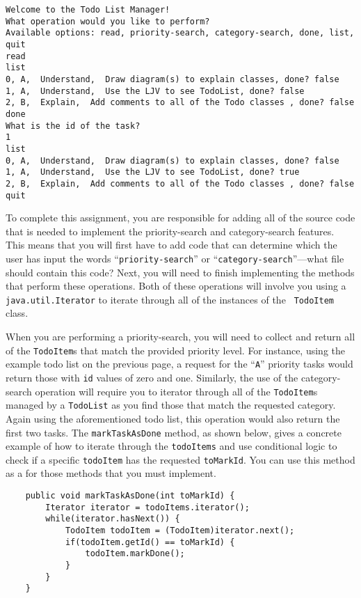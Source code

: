 \vspace{-0.05in}
\begin{verbatim}
Welcome to the Todo List Manager!
What operation would you like to perform?
Available options: read, priority-search, category-search, done, list, quit
read
list
0, A,  Understand,  Draw diagram(s) to explain classes, done? false
1, A,  Understand,  Use the LJV to see TodoList, done? false
2, B,  Explain,  Add comments to all of the Todo classes , done? false
done
What is the id of the task?
1
list
0, A,  Understand,  Draw diagram(s) to explain classes, done? false
1, A,  Understand,  Use the LJV to see TodoList, done? true
2, B,  Explain,  Add comments to all of the Todo classes , done? false
quit
\end{verbatim}
\vspace{-0.05in}

To complete this assignment, you are responsible for adding all of the source code that is needed to implement the
priority-search and category-search features. This means that you will first have to add code that can determine which
the user has input the words ``{\tt priority-search}'' or ``{\tt category-search}''---what file should contain this
code?  Next, you will need to finish implementing the methods that perform these operations.  Both of these
operations will involve you using a {\tt java.util.Iterator} to iterate through all of the instances of the {\tt
  TodoItem} class. 

When you are performing a priority-search, you will need to collect and return all of the {\tt TodoItem}s that match the
provided priority level.  For instance, using the example todo list on the previous page, a request for the ``{\tt A}''
priority tasks would return those with {\tt id} values of zero and one. Similarly, the use of the category-search operation
will require you to iterator through all of the {\tt TodoItem}s managed by a {\tt TodoList} as you find those that match
the requested category. Again using the aforementioned todo list, this operation would also return the first two tasks.
The {\tt markTaskAsDone} method, as shown below, gives a concrete example of how to iterate through the {\tt todoItems}
and use conditional logic to check if a specific {\tt todoItem} has the requested {\tt toMarkId}. You can use this
method as a for those methods that you must implement.

\vspace{-0.1in}
\begin{verbatim}
    public void markTaskAsDone(int toMarkId) {
        Iterator iterator = todoItems.iterator();
        while(iterator.hasNext()) {
            TodoItem todoItem = (TodoItem)iterator.next();
            if(todoItem.getId() == toMarkId) {
                todoItem.markDone();
            }
        }
    }
\end{verbatim}

